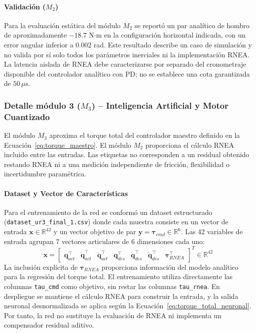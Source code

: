 \documentclass[12pt]{article}
\begin{document}
\paragraph{Validación ($M_2$)}
Para la evaluación estática del módulo $M_2$ se reportó un par analítico de hombro de aproximadamente $-18.7$ N$\cdot$m en la configuración horizontal indicada, con un error angular inferior a $0.002$ rad. Este resultado describe un caso de simulación y no valida por sí solo todos los parámetros inerciales ni la implementación RNEA. La latencia aislada de RNEA debe caracterizarse por separado del cronometraje disponible del controlador analítico con PD; no se establece una cota garantizada de $50\,\mu\text{s}$.

\subsubsection{Detalle módulo 3 ($M_3$) -- Inteligencia Artificial y Motor Cuantizado}
\label{sssec:detalle_m3}

El módulo $M_3$ aproxima el torque total del controlador maestro definido en la Ecuación~\eqref{eq:torque_maestro}. El módulo $M_2$ proporciona el cálculo RNEA incluido entre las entradas. Las etiquetas no corresponden a un residual obtenido restando RNEA ni a una medición independiente de fricción, flexibilidad o incertidumbre paramétrica.

\paragraph{Dataset y Vector de Características}
Para el entrenamiento de la red se conformó un dataset estructurado (\texttt{dataset\_ur3\_final\_1.csv}) donde cada muestra consiste en un vector de entrada $\bm{x} \in \mathbb{R}^{42}$ y un vector objetivo de par $\bm{y} = \bm{\tau}_{cmd} \in \mathbb{R}^6$. Las 42 variables de entrada agrupan 7 vectores articulares de 6 dimensiones cada uno:
\begin{equation}
    \bm{x} = \begin{bmatrix}
        \bm{q}_{act}^{\top} & \dot{\bm{q}}_{act}^{\top} & \ddot{\bm{q}}_{act}^{\top} & \bm{q}_{des}^{\top} & \dot{\bm{q}}_{des}^{\top} & \ddot{\bm{q}}_{des}^{\top} & \bm{\tau}_{RNEA}^{\top}
    \end{bmatrix}^T \in \mathbb{R}^{42}
    \label{eq:nn_input_vector}
\end{equation}
La inclusión explícita de $\bm{\tau}_{RNEA}$ proporciona información del modelo analítico para la regresión del torque total. El entrenamiento utiliza directamente las columnas \texttt{tau\_cmd} como objetivo, sin restar las columnas \texttt{tau\_rnea}. En despliegue se mantiene el cálculo RNEA para construir la entrada, y la salida neuronal desnormalizada se aplica según la Ecuación~\eqref{eq:torque_total_neuronal}. Por tanto, la red no sustituye la evaluación de RNEA ni implementa un compensador residual aditivo.
\end{document}
